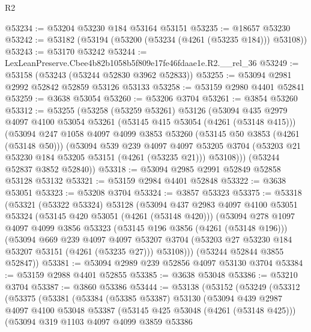 \begin{lexlean}{R2}
\begin{coremodule}
@53234 := @53204 @53230 @184 @53164 @53151
@53235 := @18657 @53230
@53242 := @53182 (@53194 (@53200 (@53234 (@4261 (@53235 @184))) @53108))
@53243 := @53170 @53242
@53244 := LexLeanPreserve.Cbee4b82b1058b5f809e17fe46fdaae1e.R2.__rel_36
@53249 := @53158 (@53243 (@53244 @52830 @3962 @52833))
@53255 := @53094 @2981 @2992 @52842 @52859 @53126 @53133
@53258 := @53159 @2980 @4401 @52841
@53259 := @3638 @53054
@53260 := @53206 @3704
@53261 := @3854 @53260
@53312 := @53255
    (@53258
      (@53259 @53261)
      @53126
      (@53094
        @435
        @2979
        @4097
        @4100
        @53054
        @53261
        (@53145 @415 @53054 (@4261 (@53148 @415)))
        (@53094
          @247
          @1058
          @4097
          @4099
          @3853
          @53260
          (@53145 @50 @3853 (@4261 (@53148 @50)))
          (@53094
            @539
            @239
            @4097
            @4097
            @53205
            @3704
            (@53203 @21 @53230 @184 @53205 @53151 (@4261 (@53235 @21)))
            @53108)))
      (@53244 @52837 @3852 @52840))
@53318 := @53094 @2985 @2991 @52849 @52858 @53128 @53132
@53321 := @53159 @2984 @4401 @52848
@53322 := @3638 @53051
@53323 := @53208 @3704
@53324 := @3857 @53323
@53375 := @53318
    (@53321
      (@53322 @53324)
      @53128
      (@53094
        @437
        @2983
        @4097
        @4100
        @53051
        @53324
        (@53145 @420 @53051 (@4261 (@53148 @420)))
        (@53094
          @278
          @1097
          @4097
          @4099
          @3856
          @53323
          (@53145 @196 @3856 (@4261 (@53148 @196)))
          (@53094
            @669
            @239
            @4097
            @4097
            @53207
            @3704
            (@53203 @27 @53230 @184 @53207 @53151 (@4261 (@53235 @27)))
            @53108)))
      (@53244 @52844 @3855 @52847))
@53381 := @53094 @2989 @239 @52856 @4097 @53130 @3704
@53384 := @53159 @2988 @4401 @52855
@53385 := @3638 @53048
@53386 := @53210 @3704
@53387 := @3860 @53386
@53444 := @53138
    (@53152
      (@53249
        (@53312
          (@53375
            (@53381
              (@53384
                (@53385 @53387)
                @53130
                (@53094
                  @439
                  @2987
                  @4097
                  @4100
                  @53048
                  @53387
                  (@53145 @425 @53048 (@4261 (@53148 @425)))
                  (@53094
                    @319
                    @1103
                    @4097
                    @4099
                    @3859
                    @53386

\end{coremodule}
\end{lexlean}
